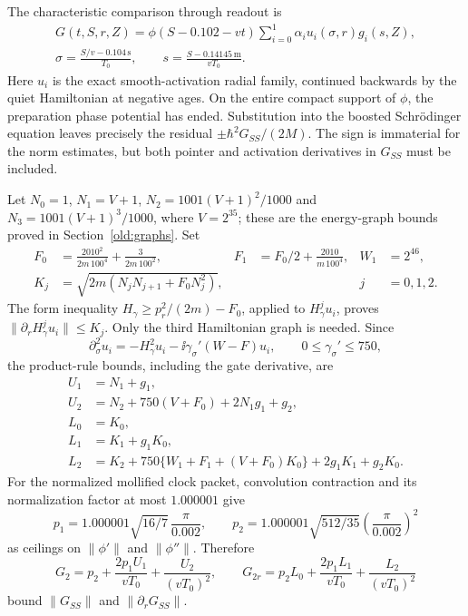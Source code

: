 \documentclass[11pt]{article}
\theoremstyle{definition}\newtheorem{definition}[theorem]{Definition}
\theoremstyle{remark}\newtheorem{remark}[theorem]{Remark}
\begin{document}
The characteristic comparison through readout is
\begin{equation}\label{hold:comparison}
 \begin{aligned}
 G(t,S,r,Z)=\phi(S-0.102-vt)
       \sum_{i=0}^1\alpha_i u_i(\sigma,r)g_i(s,Z),\\
 \sigma=\frac{S/v-0.104\,\mathrm s}{T_0},\qquad
 s=\frac{S-0.14145\,\mathrm m}{vT_0}.
 \end{aligned}
\end{equation}
Here $u_i$ is the exact smooth-activation radial family, continued
backwards by the quiet Hamiltonian at negative ages.  On the entire
compact support of $\phi$, the preparation phase potential has ended.
Substitution into the boosted Schr\"odinger equation leaves precisely
the residual $\pm\hbar^2G_{SS}/(2M)$.  The sign is immaterial for
the norm estimates, but both pointer and activation derivatives in
$G_{SS}$ must be included.

Let $N_0=1$, $N_1=V+1$, $N_2=1001(V+1)^2/1000$ and
$N_3=1001(V+1)^3/1000$, where $V=2^{35}$; these are the energy-graph
bounds proved in Section~\ref{old:graphs}.  Set
\begin{align*}
 F_0&=\frac{2010^2}{2m\,100^4}+\frac{3}{2m\,100^2},&
 F_1&=F_0/2+\frac{2010}{m\,100^4},& W_1&=2^{46},\\
 K_j&=\sqrt{2m(N_jN_{j+1}+F_0N_j^2)},&&&j&=0,1,2.
\end{align*}
The form inequality $H_\gamma\geq p_r^2/(2m)-F_0$, applied to
$H_\gamma^ju_i$, proves $\|\partial_rH_\gamma^ju_i\|\leq K_j$.
Only the third Hamiltonian graph is needed.  Since
\[
 \partial_\sigma^2u_i=-H_\gamma^2u_i
       -\ii\gamma_\sigma'(W-F)u_i,
 \qquad 0\leq\gamma_\sigma'\leq750,
\]
the product-rule bounds, including the gate derivative, are
\begin{align*}
 U_1&=N_1+g_1,\\
 U_2&=N_2+750(V+F_0)+2N_1g_1+g_2,\\
 L_0&=K_0,\\
 L_1&=K_1+g_1K_0,\\
 L_2&=K_2+750\{W_1+F_1+(V+F_0)K_0\}
                         +2g_1K_1+g_2K_0.
\end{align*}
For the normalized mollified clock packet, convolution contraction
and its normalization factor at most $1.000001$ give
\[
 p_1=1.000001\sqrt{16/7}\,\frac{\pi}{0.002},\qquad
 p_2=1.000001\sqrt{512/35}\left(\frac{\pi}{0.002}\right)^2
\]
as ceilings on $\|\phi'\|$ and $\|\phi''\|$.  Therefore
\begin{equation}\label{hold:residualjets}
 G_2=p_2+\frac{2p_1U_1}{vT_0}+\frac{U_2}{(vT_0)^2},\qquad
 G_{2r}=p_2L_0+\frac{2p_1L_1}{vT_0}+\frac{L_2}{(vT_0)^2}
\end{equation}
bound $\|G_{SS}\|$ and $\|\partial_rG_{SS}\|$.
\end{document}

